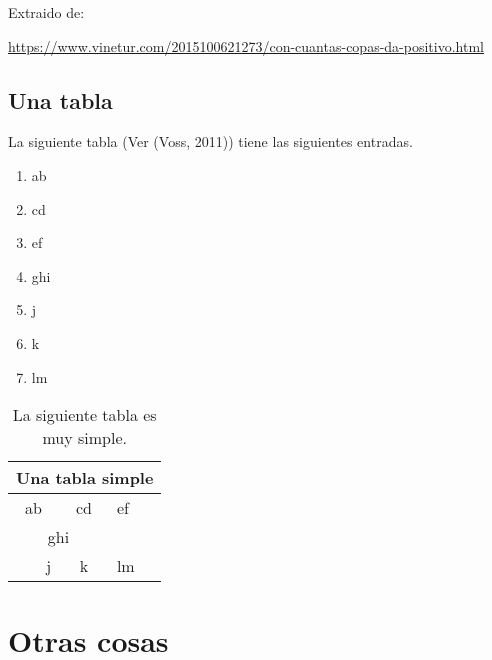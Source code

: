 \documentclass[12pt,a4paper]{report}
\begin{document}
	Extraido de:
	
	\textcolor{red}{\url{https://www.vinetur.com/2015100621273/con-cuantas-copas-da-positivo.html}}
	
\section{Una tabla}	

La siguiente tabla (Ver (Voss, 2011)) tiene las siguientes entradas.

\begin{enumerate}
	\item ab
	\item cd
	\item ef
	\item ghi
	\item j
	\item k
	\item lm
\end{enumerate}

\begin{table}[H]
	\centering
	\caption{La siguiente tabla es muy simple.}\label{t2}
	\vspace{1.8cm}
	\begin{tabular}{|c|c|l||}
	\hline
	\multicolumn{3}{|c|}{Una tabla simple}\\
	\hline
	ab&cd&ef\\
	\cline{1-2}
	\multicolumn{2}{|c|}{ghi}&\\
	\hline
	\multicolumn{1}{|r|}{j}&k&lm\\
	\hline
	\end{tabular}
\end{table}

\chapter{Otras cosas}
\end{document}
